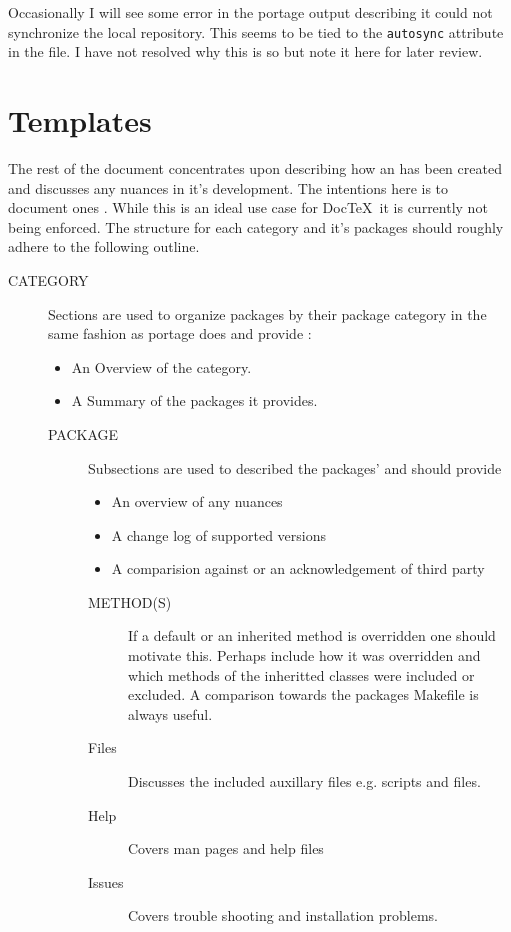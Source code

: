 \documentclass{article}
\begin{document}
Occasionally I will see some error in the portage output describing it could not synchronize the local repository.
This seems to be tied to the \lstinline|autosync| attribute in the  file.
I have not resolved why this is so but note it here for later review.

\section{Templates}

The rest of the document concentrates upon describing how an \eBuild has been created and discusses any nuances in it's development.
The intentions here is to document ones . 
While this is an ideal use case for Doc\TeX\ it is currently not being enforced.
The structure for each category and it's packages should roughly adhere to the following outline.

\begin{description}
\item[CATEGORY]
Sections are used to organize packages by their package category in the same fashion as portage does and provide :
\begin{itemize}
\item An Overview of the category.
\item A Summary of the packages it provides.
\end{itemize}
\begin{description}
\item[PACKAGE]
Subsections are used to described the packages' \eBuild and should provide
\begin{itemize}
\item An overview of any nuances
\item A change log of supported versions
\item A comparision against or an acknowledgement of third party 
\end{itemize}
\begin{description}
\item[METHOD(S)] If a default or an inherited method is overridden one should motivate this.
Perhaps include how it was overridden and which methods of the inheritted classes were included or excluded.
A comparison towards the packages Makefile is always useful. 

\item[Files] Discusses the included auxillary files e.g.  scripts and  files.
\item[Help] Covers man pages and help files
\item[Issues] Covers trouble shooting and installation problems.
\end{description}
\end{description}
\end{description}
\end{document}

